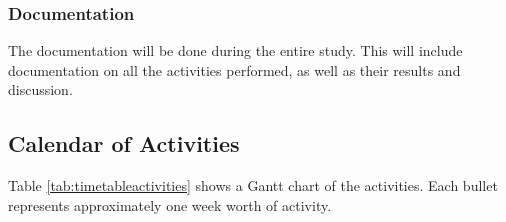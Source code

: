 \subsubsection{Documentation}
The documentation will be done during the entire study. This will include documentation on all the activities performed, as well as their results and discussion.

\subsection{Calendar of Activities}
Table \ref{tab:timetableactivities} shows a Gantt chart of the activities.  Each bullet represents approximately
one week worth of activity.

%
%
\newcommand{\weekone}{\textbullet}
\newcommand{\weektwo}{\textbullet \textbullet}
\newcommand{\weekthree}{\textbullet \textbullet \textbullet}
\newcommand{\weekfour}{\textbullet \textbullet \textbullet \textbullet}

%
%
\begin{comment}
   \newcommand{\weekone}{$\star$}
   \newcommand{\weektwo}{$\star \star$}
   \newcommand{\weekthree}{$\star \star \star$}
   \newcommand{\weekfour}{$\star \star \star \star$ }
\end{comment}

